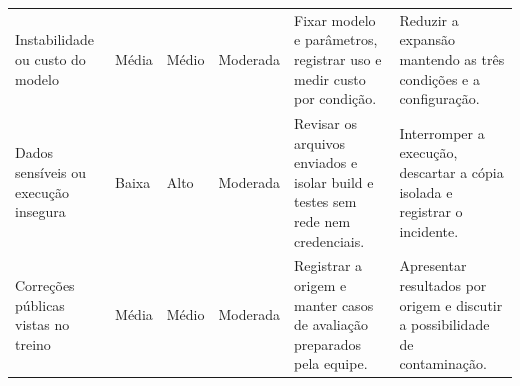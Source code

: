 {\begin{longtable}{@{}>{\raggedright\arraybackslash}p{3.0cm}lll>{\raggedright\arraybackslash}p{3.8cm}>{\raggedright\arraybackslash}p{3.8cm}@{}}
Instabilidade ou custo do modelo & Média & Médio & Moderada &
Fixar modelo e parâmetros, registrar uso e medir custo por condição. &
Reduzir a expansão mantendo as três condições e a configuração. \\
Dados sensíveis ou execução insegura & Baixa & Alto & Moderada &
Revisar os arquivos enviados e isolar build e testes sem rede nem credenciais. &
Interromper a execução, descartar a cópia isolada e registrar o incidente. \\
Correções públicas vistas no treino & Média & Médio & Moderada &
Registrar a origem e manter casos de avaliação preparados pela equipe. &
Apresentar resultados por origem e discutir a possibilidade de contaminação. \\
\bottomrule
\end{longtable}
}
